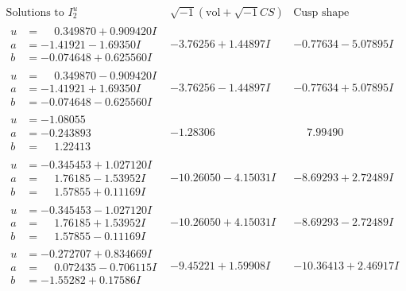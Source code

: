 \documentclass[1p]{elsarticle_modified}
\theoremstyle{definition}
\newcommand{\I}{\sqrt{-1}}
\begin{document}
$$\begin{array}{c|c|c}  
\text{Solutions to }I^u_{2}& \I (\text{vol} + \sqrt{-1}CS) & \text{Cusp shape}\\
 \hline 
\begin{aligned}
u &= \phantom{-}0.349870 + 0.909420 I \\
a &= -1.41921 - 1.69350 I \\
b &= -0.074648 + 0.625560 I\end{aligned}
 & -3.76256 + 1.44897 I & -0.77634 - 5.07895 I \\ \hline\begin{aligned}
u &= \phantom{-}0.349870 - 0.909420 I \\
a &= -1.41921 + 1.69350 I \\
b &= -0.074648 - 0.625560 I\end{aligned}
 & -3.76256 - 1.44897 I & -0.77634 + 5.07895 I \\ \hline\begin{aligned}
u &= -1.08055\phantom{ +0.000000I} \\
a &= -0.243893\phantom{ +0.000000I} \\
b &= \phantom{-}1.22413\phantom{ +0.000000I}\end{aligned}
 & -1.28306\phantom{ +0.000000I} & \phantom{-}7.99490\phantom{ +0.000000I} \\ \hline\begin{aligned}
u &= -0.345453 + 1.027120 I \\
a &= \phantom{-}1.76185 - 1.53952 I \\
b &= \phantom{-}1.57855 + 0.11169 I\end{aligned}
 & -10.26050 - 4.15031 I & -8.69293 + 2.72489 I \\ \hline\begin{aligned}
u &= -0.345453 - 1.027120 I \\
a &= \phantom{-}1.76185 + 1.53952 I \\
b &= \phantom{-}1.57855 - 0.11169 I\end{aligned}
 & -10.26050 + 4.15031 I & -8.69293 - 2.72489 I \\ \hline\begin{aligned}
u &= -0.272707 + 0.834669 I \\
a &= \phantom{-}0.072435 - 0.706115 I \\
b &= -1.55282 + 0.17586 I\end{aligned}
 & -9.45221 + 1.59908 I & -10.36413 + 2.46917 I \\ \hline\begin{aligned}

\end{aligned}
\end{array}$$
\end{document}
